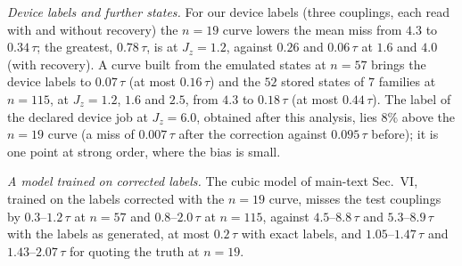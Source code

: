 \documentclass[aps,prx,onecolumn,10pt,nofootinbib,longbibliography,floatfix]{revtex4-2}
\theoremstyle{remark}
\newcommand{\Jz}{J_z}
\begin{document}
\emph{Device labels and further states.} For our device labels (three couplings, each read with and without
recovery) the $n=19$ curve lowers the mean miss from $4.3$ to $0.34\,\tau$; the greatest, $0.78\,\tau$, is at %
$\Jz=1.2$, against $0.26$ and $0.06\,\tau$ at $1.6$ and $4.0$ (with recovery). A curve built from the emulated %
states at $n=57$ brings the device labels to $0.07\,\tau$ (at most $0.16\,\tau$) and the $52$ stored states of %
$7$ families at $n=115$, at $\Jz=1.2$, $1.6$ and $2.5$, from $4.3$ to $0.18\,\tau$ (at most $0.44\,\tau$). The label %
of the declared device job at $\Jz=6.0$, obtained after this analysis, lies $8\%$ above the $n=19$ curve (a miss of %
$0.007\,\tau$ after the correction against $0.095\,\tau$ before); it is one point at strong order, where the bias is %
small.

\emph{A model trained on corrected labels.} The cubic model of main-text Sec.~VI, trained on the labels corrected
with the $n=19$ curve, misses the test couplings by $0.3$--$1.2\,\tau$ at $n=57$ and $0.8$--$2.0\,\tau$ at $n=115$, %
against $4.5$--$8.8\,\tau$ and $5.3$--$8.9\,\tau$ with the labels as generated, at most $0.2\,\tau$ with exact %
labels, and $1.05$--$1.47\,\tau$ and $1.43$--$2.07\,\tau$ for quoting the truth at $n=19$. %
\end{document}
